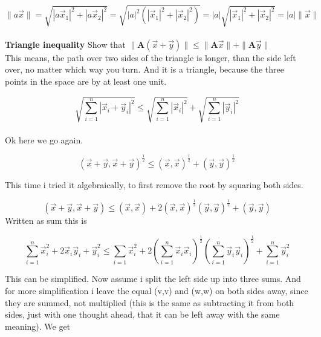 \documentclass[a4paper]{article}
\begin{document}
\begin{displaymath}
    \|a\vec{x}\| = \sqrt{|a\vec{x}_1|^{2} + |a\vec{x}_2|^{2}} = \sqrt{|a|^{2}(|\vec{x}_1|^{2} + |\vec{x}_2|^{2})} = |a|\sqrt{|\vec{x}_1|^{2} + |\vec{x}_2|^{2}} = |a|\|\vec{x}\|
\end{displaymath}\\

\textbf{Triangle inequality} Show that $ \|\boldsymbol{A}(\vec{x} + \vec{y})\| \leq \|\boldsymbol{A}\vec{x}\| + \|\boldsymbol{A}\vec{y}\|$\\

This means, the path over two sides of the triangle is longer, than the side left over, no matter which way you turn. And it is a triangle, because the three points in the space are by at least one unit.

\begin{displaymath}
    \sqrt{\sum_{i=1}^{n}|\vec{x}_{i} + \vec{y}_{i}|^{2}} \leq \sqrt{\sum_{i=1}^{n}|\vec{x}_{i}|^{2}} + \sqrt{\sum_{i=1}^{n}|\vec{y}_{i}|^{2}} 
\end{displaymath}\\

Ok here we go again.

\begin{displaymath}
(\vec{x}+\vec{y}, \vec{x}+\vec{y})^{\frac{1}{2}} \leq (\vec{x},\vec{x})^{\frac{1}{2}}+(\vec{y},\vec{y})^{\frac{1}{2}}
\end{displaymath}

 This time i tried it algebraically, to first remove the root by squaring both sides. 

\begin{displaymath}
(\vec{x}+\vec{y}, \vec{x}+\vec{y}) \leq (\vec{x},\vec{x}) + 2(\vec{x},\vec{x})^{\frac{1}{2}}(\vec{y},\vec{y})^{\frac{1}{2}} + (\vec{y},\vec{y})
\end{displaymath}
Written as sum this is

\begin{displaymath}
\sum_{i=1}^{n}\vec{x}_{i}^{2}+2\vec{x}_{i}\vec{y}_{i}+\vec{y}_{i}^{2} \leq \sum_{i=1}\vec{x}_{i}^{2}+2(\sum_{i=1}^{n}\vec{x}_{i}\vec{x}_{i})^{\frac{1}{2}}(\sum_{i=1}^{n}\vec{y}_{i}\vec{y}_{i})^{\frac{1}{2}}+\sum_{i=1}^{n}\vec{y}_{i}^{2}
\end{displaymath}

This can be simplified. Now assume i split the left side up into three sums. And for more simplification i leave the equal (v,v) and (w,w) on both sides away, since they are summed, not multiplied (this is the same as subtracting it from both sides, just with one thought ahead, that it can be left away with the same meaning). We get
\end{document}

